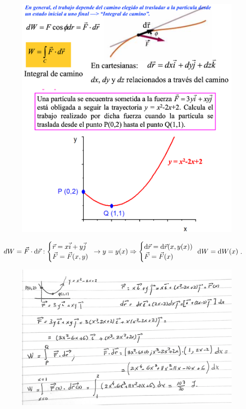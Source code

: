 \begin{figure}[H]
		\centering
		\includegraphics[width=.8\textwidth]{imagenes/imagenes03/T03IM04.png}
		\end{figure}

\vspace{-4mm}\noindent \small{\textcolor{gris}{$dW=\vec F \cdot \dd \vec r:\begin{cases}  \vec r=x\vec i +y \vec j \\  \vec F=\vec F(x,y) \end{cases} \hspace{-2mm}\to  y=y(x) \Rightarrow  \begin{cases} \dd \vec r=\dd \vec r(x,y(x)) \\ \vec F=\vec F(x) \end{cases} \hspace{-2mm} \dd W= \dd W(x)$}\normalsize{.}}

\begin{figure}[H]
		\centering
		\includegraphics[width=.8\textwidth]{imagenes/imagenes03/T03IM13.png}
		\end{figure}

